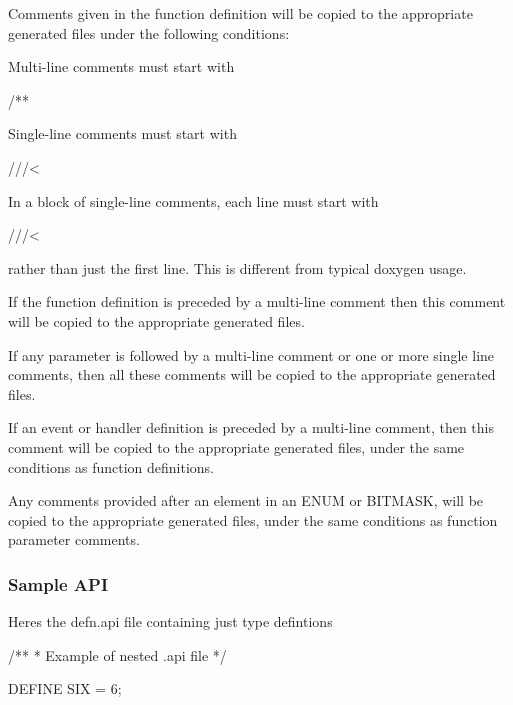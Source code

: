 Comments given in the function definition will be copied to the appropriate generated files under the following conditions\+:
\begin{DoxyItemize}
\item Multi-\/line comments must start with\begin{DoxyVerb}/** \end{DoxyVerb}

\item Single-\/line comments must start with\begin{DoxyVerb}///< \end{DoxyVerb}

\item In a block of single-\/line comments, each line must start with\begin{DoxyVerb}///< \end{DoxyVerb}
 rather than just the first line. This is different from typical doxygen usage.
\item If the function definition is preceded by a multi-\/line comment then this comment will be copied to the appropriate generated files.
\item If any parameter is followed by a multi-\/line comment or one or more single line comments, then all these comments will be copied to the appropriate generated files.
\end{DoxyItemize}

If an event or handler definition is preceded by a multi-\/line comment, then this comment will be copied to the appropriate generated files, under the same conditions as function definitions.

Any comments provided after an element in an E\+N\+U\+M or B\+I\+T\+M\+A\+S\+K, will be copied to the appropriate generated files, under the same conditions as function parameter comments.\hypertarget{interface_def_lang_syntax_interfaceDefLangSyntax_sample}{}\subsubsection{Sample A\+P\+I}\label{interface_def_lang_syntax_interfaceDefLangSyntax_sample}
Here\textquotesingle{}s the {\ttfamily defn.\+api} file containing just type defintions


\begin{DoxyVerbInclude}
/**
 * Example of nested .api file
 */

DEFINE SIX = 6;
\end{DoxyVerbInclude}


